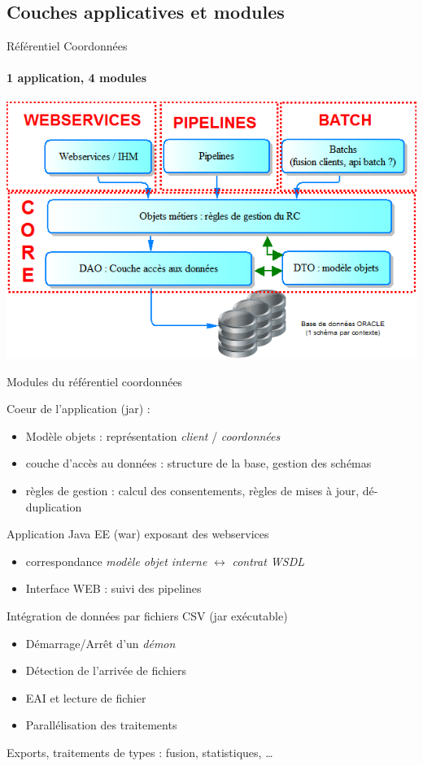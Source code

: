 \documentclass[compact]{beamer}%
\begin{document}
\subsection{Couches applicatives et modules}

\begin{frame}{Référentiel Coordonnées}
	\framesubtitle{1 application, 4 modules}

	\includegraphics[width=\textwidth]{images/rc_arch_general.png}
\end{frame}

\begin{frame}{Modules du référentiel coordonnées}
	\begin{description}[<+->]
	\item[Core] Coeur de l'application (jar) :
		\begin{itemize}
		\item Modèle objets : représentation \emph{client} / \emph{coordonnées}
		\item couche d'accès au données : structure de la base, gestion des schémas
		\item règles de gestion : calcul des consentements, règles de mises à jour, dé-duplication
		\end{itemize}
	\item[Webservices] Application Java EE (war) exposant des webservices
		\begin{itemize}
		\item correspondance \emph{modèle objet interne} $\leftrightarrow$ \emph{contrat WSDL}
		\item Interface WEB : suivi des pipelines
		\end{itemize}
	\item[Pipelines] Intégration de données par fichiers CSV (jar exécutable)
		\begin{itemize}
		\item Démarrage/Arrêt d'un \emph{démon}
		\item Détection de l'arrivée de fichiers
		\item EAI et lecture de fichier
		\item Parallélisation des traitements
		\end{itemize}
	\item[Batch] Exports, traitements de types : fusion, statistiques, \dots
	\end{description}
\end{frame}
\end{document}
